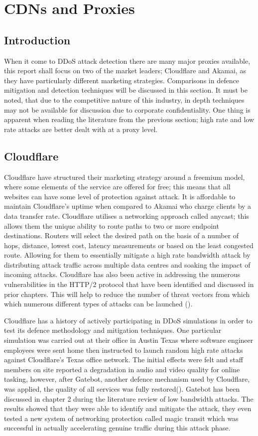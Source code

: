 \section{CDNs and Proxies}
\subsection{Introduction}
When it come to DDoS attack detection there are many major proxies available, this report shall focus on two of the market leaders; Cloudflare and Akamai, as they have particularly different marketing strategies. Comparisons in defence mitigation and detection techniques will be discussed in this section. It must be noted, that due to the competitive nature of this industry, in depth techniques may not be available for discussion due to corporate confidentiality. One thing is apparent when reading the literature from the previous section; high rate and low rate attacks are better dealt with at a proxy level.
\subsection{Cloudflare}
Cloudflare have structured their marketing strategy around a freemium model, where some elements of the service are offered for free; this means that all websites can have some level of protection against attack. It is affordable to maintain Cloudflare's uptime when compared to Akamai who charge clients by a data transfer rate. Cloudflare utilises a networking approach called anycast; this allows them the unique ability to route paths to two or more endpoint destinations. Routers will select the desired path on the basis of a number of hops, distance, lowest cost, latency measurements or based on the least congested route. Allowing for them to essentially mitigate a high rate bandwidth attack by distributing attack traffic across multiple data centres and soaking the impact of incoming attacks. Cloudflare has also been active in addressing the numerous vulnerabilities in the HTTP/2 protocol that have been identified and discussed in prior chapters. This will help to reduce the number of threat vectors from which which numerous different types of attacks can be launched (\cite{CFHTTP2}).

Cloudflare has a history of actively participating in DDoS simulations in order to test its defence methodology and mitigation techniques. One particular simulation was carried out at their office in Austin Texas where software engineer employees were sent home then instructed to launch random high rate attacks against Cloudflare's Texas office network. The initial effects were felt and staff members on site reported a degradation in audio and video quality for online tasking, however, after Gatebot, another defence mechanism used by Cloudflare, was applied, the quality of all services was fully restored(\cite{CFAustin}). Gatebot has been discussed in chapter 2 during the literature review of low bandwidth attacks. The results showed that they were able to identify and mitigate the attack, they even tested a new system of networking protection called magic transit which was successful in actually accelerating genuine traffic during this attack phase.

